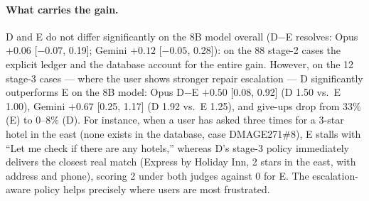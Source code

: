 \documentclass[11pt]{article}
\begin{document}
\paragraph{What carries the gain.} D and E do not differ significantly on the 8B model overall (D$-$E
resolves: Opus $+0.06$ [$-0.07$, 0.19]; Gemini $+0.12$ [$-0.05$, 0.28]): on the 88 stage-2 cases the
explicit ledger and the database account for the entire gain. However, on the 12 stage-3 cases --- where the
user shows stronger repair escalation --- D significantly outperforms E on the 8B model: Opus D$-$E $+0.50$
[0.08, 0.92] (D 1.50 vs.\ E 1.00), Gemini $+0.67$ [0.25, 1.17] (D 1.92 vs.\ E 1.25), and give-ups drop from
33\% (E) to 0--8\% (D). For instance, when a user has asked three times for a 3-star hotel in the east (none
exists in the database, case DMAGE271\#8), E stalls with ``Let me check if there are any hotels,'' whereas D's
stage-3 policy immediately delivers the closest real match (Express by Holiday Inn, 2 stars in the east, with
address and phone), scoring 2 under both judges against 0 for E. The escalation-aware policy helps precisely
where users are most frustrated.
\end{document}
